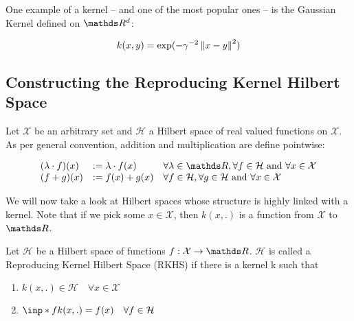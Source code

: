 One example of a kernel -- and one of the most popular ones -- is the Gaussian Kernel defined on $\R^d$:

$$
    k(x, y) = \exp (-\gamma^{-2}\left\lVert x - y\right\rVert^2)
$$

\subsection{Constructing the Reproducing Kernel Hilbert Space}

Let $\mathcal{X}$ be an arbitrary set and $\mathcal{H}$ a Hilbert space of real valued functions
on $\mathcal{X}$. As per general convention, addition and multiplication are define pointwise:

\begin{equation}
    \begin{array}{lll}
    (\lambda \cdot f)(x) & :=\lambda \cdot f(x) & \forall \lambda \in \R, \forall f \in \mathcal{H} \text { and } \forall x \in \mathcal{X} \\
    (f+g)(x) & :=f(x)+g(x) & \forall f \in \mathcal{H}, \forall g \in \mathcal{H} \text { and } \forall x \in \mathcal{X}
    \end{array}
\end{equation}





We will now take a look at Hilbert spaces whose structure is highly linked with a kernel. 
Note that if we pick some $x \in \mathcal{X}$, then $k(x, .)$ is a function from $\mathcal{X}$ to $\R$.

\begin{definition}
    Let $\mathcal{H}$ be a Hilbert space of functions $f: \mathcal{X} \rightarrow \R$. 
    $\mathcal{H}$ is called a Reproducing Kernel Hilbert Space (RKHS) if there is a kernel k such that

    \begin{enumerate}
        \item $ k(x, .) \in \mathcal{H} \quad \forall x \in \mathcal{X}$
        \item $ \inp*{f}{k(x, .)} = f(x) \quad \forall f \in \mathcal{H}$
    \end{enumerate}

\end{definition}

